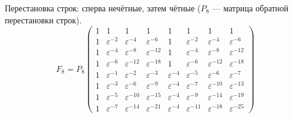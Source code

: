 Перестановка строк: сперва нечётные, затем чётные ($P_8$ --- матрица обратной перестановки строк).
\[
    F_8
    = P_8
    \begin{pmatrix}
        1 & 1                & 1                 & 1                 & 1                & 1                 & 1                 & 1                 \\
        1 & \varepsilon^{-2} & \varepsilon^{-4}  & \varepsilon^{-6}  & 1                & \varepsilon^{-2}  & \varepsilon^{-4}  & \varepsilon^{-6}  \\
        1 & \varepsilon^{-4} & \varepsilon^{-8}  & \varepsilon^{-12} & 1                & \varepsilon^{-4}  & \varepsilon^{-8}  & \varepsilon^{-12} \\
        1 & \varepsilon^{-6} & \varepsilon^{-12} & \varepsilon^{-18} & 1                & \varepsilon^{-6}  & \varepsilon^{-12} & \varepsilon^{-18} \\
        1 & \varepsilon^{-1} & \varepsilon^{-2}  & \varepsilon^{-3}  & \varepsilon^{-4} & \varepsilon^{-5}  & \varepsilon^{-6}  & \varepsilon^{-7}  \\
        1 & \varepsilon^{-3} & \varepsilon^{-6}  & \varepsilon^{-9}  & \varepsilon^{-4} & \varepsilon^{-7}  & \varepsilon^{-10} & \varepsilon^{-13} \\
        1 & \varepsilon^{-5} & \varepsilon^{-10} & \varepsilon^{-15} & \varepsilon^{-4} & \varepsilon^{-9}  & \varepsilon^{-14} & \varepsilon^{-19} \\
        1 & \varepsilon^{-7} & \varepsilon^{-14} & \varepsilon^{-21} & \varepsilon^{-4} & \varepsilon^{-11} & \varepsilon^{-18} & \varepsilon^{-25}
    \end{pmatrix}
\]

